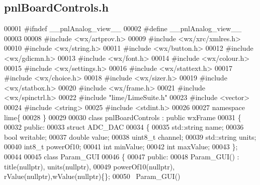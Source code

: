 \subsection{pnl\+Board\+Controls.\+h}
\label{pnlBoardControls_8h_source}

\begin{DoxyCode}
00001 \textcolor{preprocessor}{#ifndef \_\_pnlAnalog\_view\_\_}
00002 \textcolor{preprocessor}{#define \_\_pnlAnalog\_view\_\_}
00003 
00008 \textcolor{preprocessor}{#include <wx/artprov.h>}
00009 \textcolor{preprocessor}{#include <wx/xrc/xmlres.h>}
00010 \textcolor{preprocessor}{#include <wx/string.h>}
00011 \textcolor{preprocessor}{#include <wx/button.h>}
00012 \textcolor{preprocessor}{#include <wx/gdicmn.h>}
00013 \textcolor{preprocessor}{#include <wx/font.h>}
00014 \textcolor{preprocessor}{#include <wx/colour.h>}
00015 \textcolor{preprocessor}{#include <wx/settings.h>}
00016 \textcolor{preprocessor}{#include <wx/stattext.h>}
00017 \textcolor{preprocessor}{#include <wx/choice.h>}
00018 \textcolor{preprocessor}{#include <wx/sizer.h>}
00019 \textcolor{preprocessor}{#include <wx/statbox.h>}
00020 \textcolor{preprocessor}{#include <wx/frame.h>}
00021 \textcolor{preprocessor}{#include <wx/spinctrl.h>}
00022 \textcolor{preprocessor}{#include "lime/LimeSuite.h"}
00023 \textcolor{preprocessor}{#include <vector>}
00024 \textcolor{preprocessor}{#include <string>}
00025 \textcolor{preprocessor}{#include <stdint.h>}
00026 
00027 \textcolor{keyword}{namespace }lime\{
00028 \}
00029 
00030 \textcolor{keyword}{class }pnlBoardControls : \textcolor{keyword}{public} wxFrame
00031 \{
00032     \textcolor{keyword}{public}:
00033         \textcolor{keyword}{struct }ADC_DAC
00034         \{
00035             std::string name;
00036             \textcolor{keywordtype}{bool} writable;
00037             \textcolor{keywordtype}{double} value;
00038             uint8\_t channel;
00039             std::string units;
00040             int8\_t powerOf10;
00041             \textcolor{keywordtype}{int} minValue;
00042             \textcolor{keywordtype}{int} maxValue;
00043         \};
00044 
00045         \textcolor{keyword}{class }Param_GUI
00046         \{
00047         \textcolor{keyword}{public}:
00048             Param_GUI() : title(nullptr), units(nullptr),
00049                 powerOf10(nullptr), rValue(nullptr),wValue(nullptr)\{\};
00050             ~Param_GUI()

\end{DoxyCode}
